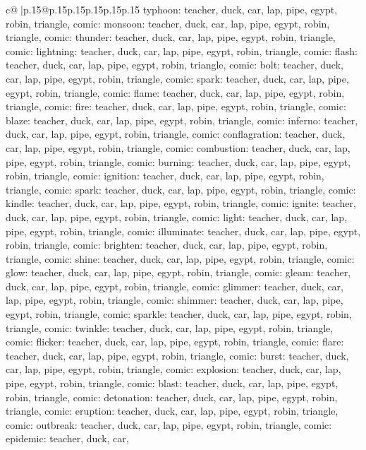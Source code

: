 \documentclass{article}
\begin{document}
{\begin{supertabular}{c@{$\;$}|p{.15\linewidth}@{}p{.15\linewidth}p{.15\linewidth}p{.15\linewidth}p{.15\linewidth}p{.15\linewidth}}
{{{typhoon\nTARGETS: teacher, duck, car, lap, pipe, egypt, robin, triangle, comic\n\nCLUE: monsoon\nTARGETS: teacher, duck, car, lap, pipe, egypt, robin, triangle, comic\n\nCLUE: thunder\nTARGETS: teacher, duck, car, lap, pipe, egypt, robin, triangle, comic\n\nCLUE: lightning\nTARGETS: teacher, duck, car, lap, pipe, egypt, robin, triangle, comic\n\nCLUE: flash\nTARGETS: teacher, duck, car, lap, pipe, egypt, robin, triangle, comic\n\nCLUE: bolt\nTARGETS: teacher, duck, car, lap, pipe, egypt, robin, triangle, comic\n\nCLUE: spark\nTARGETS: teacher, duck, car, lap, pipe, egypt, robin, triangle, comic\n\nCLUE: flame\nTARGETS: teacher, duck, car, lap, pipe, egypt, robin, triangle, comic\n\nCLUE: fire\nTARGETS: teacher, duck, car, lap, pipe, egypt, robin, triangle, comic\n\nCLUE: blaze\nTARGETS: teacher, duck, car, lap, pipe, egypt, robin, triangle, comic\n\nCLUE: inferno\nTARGETS: teacher, duck, car, lap, pipe, egypt, robin, triangle, comic\n\nCLUE: conflagration\nTARGETS: teacher, duck, car, lap, pipe, egypt, robin, triangle, comic\n\nCLUE: combustion\nTARGETS: teacher, duck, car, lap, pipe, egypt, robin, triangle, comic\n\nCLUE: burning\nTARGETS: teacher, duck, car, lap, pipe, egypt, robin, triangle, comic\n\nCLUE: ignition\nTARGETS: teacher, duck, car, lap, pipe, egypt, robin, triangle, comic\n\nCLUE: spark\nTARGETS: teacher, duck, car, lap, pipe, egypt, robin, triangle, comic\n\nCLUE: kindle\nTARGETS: teacher, duck, car, lap, pipe, egypt, robin, triangle, comic\n\nCLUE: ignite\nTARGETS: teacher, duck, car, lap, pipe, egypt, robin, triangle, comic\n\nCLUE: light\nTARGETS: teacher, duck, car, lap, pipe, egypt, robin, triangle, comic\n\nCLUE: illuminate\nTARGETS: teacher, duck, car, lap, pipe, egypt, robin, triangle, comic\n\nCLUE: brighten\nTARGETS: teacher, duck, car, lap, pipe, egypt, robin, triangle, comic\n\nCLUE: shine\nTARGETS: teacher, duck, car, lap, pipe, egypt, robin, triangle, comic\n\nCLUE: glow\nTARGETS: teacher, duck, car, lap, pipe, egypt, robin, triangle, comic\n\nCLUE: gleam\nTARGETS: teacher, duck, car, lap, pipe, egypt, robin, triangle, comic\n\nCLUE: glimmer\nTARGETS: teacher, duck, car, lap, pipe, egypt, robin, triangle, comic\n\nCLUE: shimmer\nTARGETS: teacher, duck, car, lap, pipe, egypt, robin, triangle, comic\n\nCLUE: sparkle\nTARGETS: teacher, duck, car, lap, pipe, egypt, robin, triangle, comic\n\nCLUE: twinkle\nTARGETS: teacher, duck, car, lap, pipe, egypt, robin, triangle, comic\n\nCLUE: flicker\nTARGETS: teacher, duck, car, lap, pipe, egypt, robin, triangle, comic\n\nCLUE: flare\nTARGETS: teacher, duck, car, lap, pipe, egypt, robin, triangle, comic\n\nCLUE: burst\nTARGETS: teacher, duck, car, lap, pipe, egypt, robin, triangle, comic\n\nCLUE: explosion\nTARGETS: teacher, duck, car, lap, pipe, egypt, robin, triangle, comic\n\nCLUE: blast\nTARGETS: teacher, duck, car, lap, pipe, egypt, robin, triangle, comic\n\nCLUE: detonation\nTARGETS: teacher, duck, car, lap, pipe, egypt, robin, triangle, comic\n\nCLUE: eruption\nTARGETS: teacher, duck, car, lap, pipe, egypt, robin, triangle, comic\n\nCLUE: outbreak\nTARGETS: teacher, duck, car, lap, pipe, egypt, robin, triangle, comic\n\nCLUE: epidemic\nTARGETS: teacher, duck, car, }}}
\end{supertabular}}
\end{document}

